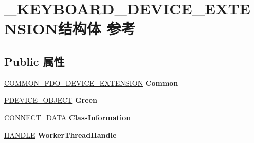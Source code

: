 \hypertarget{struct___k_e_y_b_o_a_r_d___d_e_v_i_c_e___e_x_t_e_n_s_i_o_n}{}\section{\+\_\+\+K\+E\+Y\+B\+O\+A\+R\+D\+\_\+\+D\+E\+V\+I\+C\+E\+\_\+\+E\+X\+T\+E\+N\+S\+I\+O\+N结构体 参考}
\label{struct___k_e_y_b_o_a_r_d___d_e_v_i_c_e___e_x_t_e_n_s_i_o_n}
\subsection*{Public 属性}
\begin{DoxyCompactItemize}
\item 
\mbox{\label{struct___k_e_y_b_o_a_r_d___d_e_v_i_c_e___e_x_t_e_n_s_i_o_n_a18764f35c0088675ca0eaf501dd81205}} 
\hyperlink{struct___c_o_m_m_o_n___f_d_o___d_e_v_i_c_e___e_x_t_e_n_s_i_o_n}{C\+O\+M\+M\+O\+N\+\_\+\+F\+D\+O\+\_\+\+D\+E\+V\+I\+C\+E\+\_\+\+E\+X\+T\+E\+N\+S\+I\+ON} {\bfseries Common}
\item 
\mbox{\label{struct___k_e_y_b_o_a_r_d___d_e_v_i_c_e___e_x_t_e_n_s_i_o_n_adfbd5b7eb221708848cc076814dd93ed}} 
\hyperlink{struct___d_e_v_i_c_e___o_b_j_e_c_t}{P\+D\+E\+V\+I\+C\+E\+\_\+\+O\+B\+J\+E\+CT} {\bfseries Green}
\item 
\mbox{\label{struct___k_e_y_b_o_a_r_d___d_e_v_i_c_e___e_x_t_e_n_s_i_o_n_a7be8f46365e3ed450212d73e8648e6fe}} 
\hyperlink{struct___c_o_n_n_e_c_t___d_a_t_a}{C\+O\+N\+N\+E\+C\+T\+\_\+\+D\+A\+TA} {\bfseries Class\+Information}
\item 
\mbox{\label{struct___k_e_y_b_o_a_r_d___d_e_v_i_c_e___e_x_t_e_n_s_i_o_n_a9bbeb04f91a64b0cdfa3ed3440864959}} 
\hyperlink{interfacevoid}{H\+A\+N\+D\+LE} {\bfseries Worker\+Thread\+Handle}
\item 
\mbox{\label{struct___k_e_y_b_o_a_r_d___d_e_v_i_c_e___e_x_t_e_n_s_i_o_n_a42de3e5bcc79898f77482af707208a76}} 

\end{DoxyCompactItemize}
